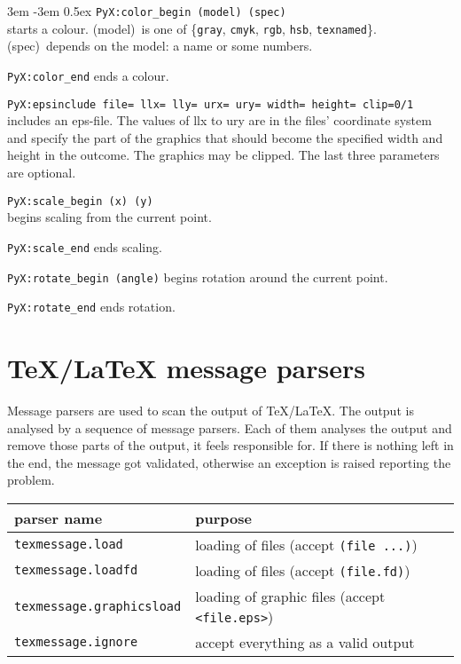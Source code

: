\begingroup
\leftskip3em
\parindent-3em
\parskip0.5ex
\texttt{PyX:color\_begin (model) (spec)}\\
  starts a colour. (model)~is one of
  \{\verb|gray|, \verb|cmyk|, \verb|rgb|, \verb|hsb|, \verb|texnamed|\}.
  (spec)~depends on the model: a name or some numbers.\par
\texttt{PyX:color\_end} ends a colour.\par
\texttt{PyX:epsinclude file= llx= lly= urx= ury= width= height= clip=0/1}\\
  includes an eps-file. The values of llx to ury are in the files' coordinate
  system and specify the part of the graphics that should become the specified
  width and height in the outcome. The graphics may be clipped. The last three
  parameters are optional.\par
\texttt{PyX:scale\_begin (x) (y)}\\
  begins scaling from the current point.\par
\texttt{PyX:scale\_end} ends scaling.\par
\texttt{PyX:rotate\_begin (angle)} begins rotation around the current
  point.\par
\texttt{PyX:rotate\_end} ends rotation.\par
\endgroup


\section{\TeX/\LaTeX{} message parsers}

Message parsers are used to scan the output of \TeX/\LaTeX. The output
is analysed by a sequence of message parsers. Each of them analyses
the output and remove those parts of the output, it feels responsible
for. If there is nothing left in the end, the message got validated,
otherwise an exception is raised reporting the problem.

\medskip
\begin{tabular}{ll}
parser name&purpose\\
\hline
\texttt{texmessage.load}&loading of files (accept \texttt{(file ...)})\\
\texttt{texmessage.loadfd}&loading of files (accept \texttt{(file.fd)})\\
\texttt{texmessage.graphicsload}&loading of graphic files (accept \texttt{<file.eps>})\\
\texttt{texmessage.ignore}&accept everything as a valid output\\
\end{tabular}
\medskip

